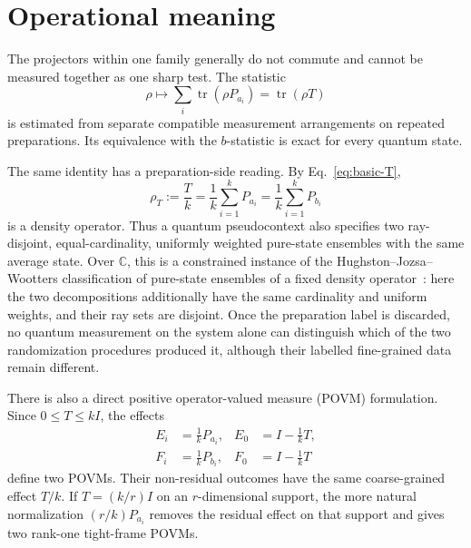 \documentclass[
  twocolumn,
  aps,
  pra,
  floatfix,
  amsmath,amssymb,
  longbibliography
]{revtex4-2}
\theoremstyle{definition}
\theoremstyle{remark}
\newcommand{\C}{\mathbb C}
\newcommand{\Tr}{\operatorname{tr}}
\newcommand{\1}{\mathbf 1}
\begin{document}
\section{Operational meaning}
\label{sec:operational}

The projectors within one family generally do not commute and cannot be
measured together as one sharp test.  The statistic
\begin{equation}
 \rho\longmapsto\sum_i\Tr(\rho P_{a_i})=\Tr(\rho T)
 \label{eq:linear-statistic}
\end{equation}
is estimated from separate compatible measurement arrangements on repeated
preparations.  Its equivalence with the $b$-statistic is exact for every
quantum state.

The same identity has a preparation-side reading.  By
Eq.~\eqref{eq:basic-T},
\begin{equation}
 \rho_T:=\frac{T}{k}
 =\frac1k\sum_{i=1}^{k}P_{a_i}
 =\frac1k\sum_{i=1}^{k}P_{b_i}
 \label{eq:uniform-ensembles}
\end{equation}
is a density operator.  Thus a quantum pseudocontext also specifies two
ray-disjoint, equal-cardinality, uniformly weighted pure-state ensembles with
the same average state.  Over $\C$, this is a constrained instance of the
Hughston--Jozsa--Wootters classification of pure-state ensembles of a fixed
density operator~\cite{Hughston-Jozsa-Wootters-1993}: here the two
decompositions additionally have the same cardinality and uniform weights,
and their ray sets are disjoint.  Once the preparation label is discarded,
no quantum measurement on the system alone can distinguish which of the two
randomization procedures produced it, although their labelled fine-grained
data remain different.

There is also a direct positive operator-valued measure (POVM) formulation.
Since $0\le T\le kI$, the effects
\begin{align}
 E_i&=\frac1kP_{a_i},&E_0&=I-\frac1kT,\nonumber\\
 F_i&=\frac1kP_{b_i},&F_0&=I-\frac1kT
 \label{eq:povms}
\end{align}
define two POVMs.  Their non-residual outcomes have the same coarse-grained
effect $T/k$.  If $T=(k/r)I$ on an $r$-dimensional support, the more natural
normalization $(r/k)P_{a_i}$ removes the residual effect on that support and
gives two rank-one tight-frame POVMs.
\end{document}
